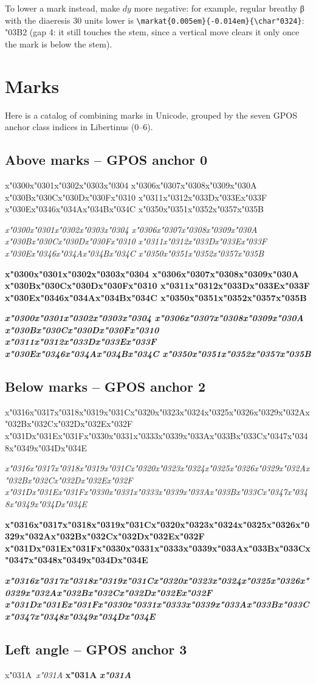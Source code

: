 \documentclass[landscape]{article}
\newcommand{\gs}{\hspace{0.5mm}}	%
\newcommand{\ribbi}[1]{#1\
	
	{\itshape #1}
	
	{\bfseries #1}
	
	{\itshape\bfseries #1}}
\newcommand{\ribbiline}[1]{#1\ 
	{\itshape #1}
	{\bfseries #1}
	{\itshape\bfseries #1}}
\begin{document}
\medskip
To lower a mark instead, make $dy$ more negative: for example, regular breathy β with the diaeresis 30 units lower is
\verb||: {\LibertinusSerifPatch\Large\char"03B2\markat{0.005em}{-0.014em}{\char"0324}}
(gap 4: it still touches the stem, since a vertical move clears it only once the mark is below the stem).

\newpage
\section*{Marks}

Here is a catalog of combining marks in Unicode, grouped by the seven GPOS anchor class indices in Libertinus (0--6).

\subsection*{Above marks -- GPOS anchor 0}

\ribbi{
	x\char"0300\gs x\char"0301\gs x\char"0302\gs x\char"0303\gs x\char"0304\gs 
	x\char"0306\gs x\char"0307\gs x\char"0308\gs x\char"0309\gs x\char"030A\gs 
	x\char"030B\gs x\char"030C\gs x\char"030D\gs x\char"030F\gs x\char"0310\gs 
	x\char"0311\gs x\char"0312\gs x\char"033D\gs x\char"033E\gs x\char"033F\gs 
	x\char"030E\gs x\char"0346\gs x\char"034A\gs x\char"034B\gs x\char"034C\gs 
	x\char"0350\gs x\char"0351\gs x\char"0352\gs x\char"0357\gs x\char"035B\gs
}

\subsection*{Below marks -- GPOS anchor 2} 

\ribbi{
	x\char"0316\gs x\char"0317\gs x\char"0318\gs x\char"0319\gs x\char"031C\gs x\char"0320\gs x\char"0323\gs x\char"0324\gs x\char"0325\gs x\char"0326\gs x\char"0329\gs x\char"032A\gs x\char"032B\gs x\char"032C\gs x\char"032D\gs x\char"032E\gs x\char"032F\gs
	\gs\gs
	x\char"031D\gs x\char"031E\gs x\char"031F\gs x\char"0330\gs x\char"0331\gs x\char"0333\gs x\char"0339\gs x\char"033A\gs x\char"033B\gs x\char"033C\gs x\char"0347\gs x\char"0348\gs x\char"0349\gs x\char"034D\gs x\char"034E\gs
}

\subsection*{Left angle -- GPOS anchor 3}

\ribbiline{x\char"031A\gs}
\end{document}
